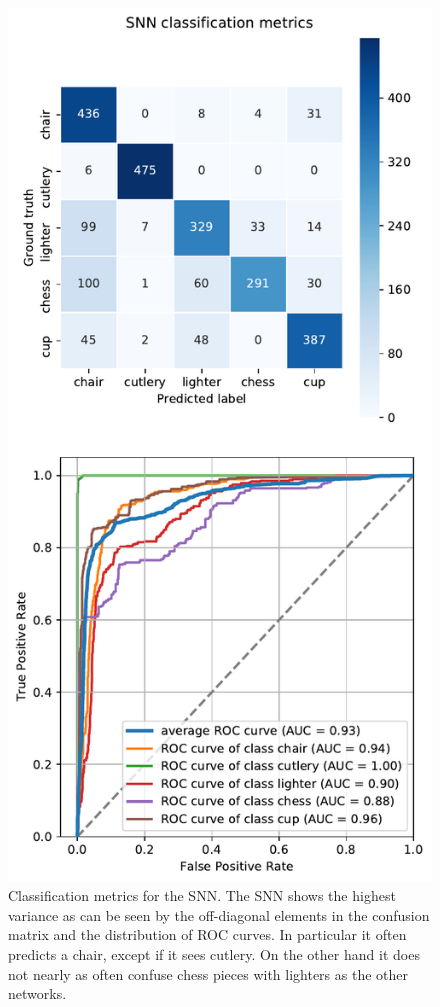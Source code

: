 \begin{figure}[H]
    \centering
\includegraphics[width=.59\textwidth]{figures/roc_snn.pdf}
\caption[Classification metrics for the SNN]{Classification metrics for the SNN. The SNN shows the highest variance as can be seen by the off-diagonal elements in the confusion matrix and the distribution of ROC curves. In particular it often predicts a chair, except if it sees cutlery. On the other hand it does not nearly as often confuse chess pieces with lighters as the other networks.}\label{fig:roc-snn}
\end{figure}\noindent
